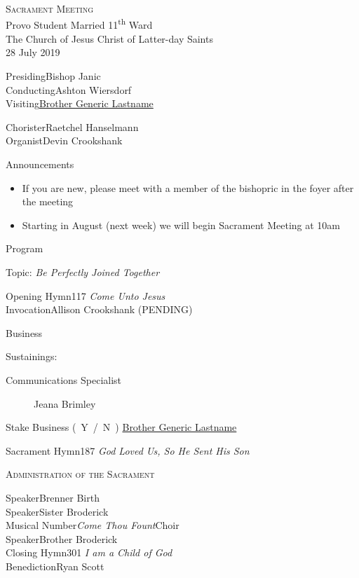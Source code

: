 \documentclass[11pt,letterpaper]{article}
\begin{document}
\begin{center}
  {\LARGE \textsc{Sacrament Meeting}}\\[0.2em]
  {\large Provo Student Married 11\textsuperscript{th} Ward}\\[0.3em]
  {\large The Church of Jesus Christ of Latter-day Saints}\\
  {28 July 2019}
\end{center}

Presiding{\dotfill}Bishop Janic\\
Conducting{\dotfill}Ashton Wiersdorf\\
Visiting{\dotfill}\uline{Brother Generic Lastname}

Chorister{\dotfill}Raetchel Hanselmann \\
Organist{\dotfill}Devin Crookshank

\begin{center}
  {\Large Announcements}
\end{center}

\begin{itemize}
\item If you are new, please meet with a member of the bishopric in the foyer after the meeting
\item Starting in August (next week) we will begin Sacrament Meeting at 10am
\end{itemize}

\begin{center}
  {\Large Program}
\end{center}
Topic: {\it Be Perfectly Joined Together}

Opening Hymn{\dotfill}117 \textit{Come Unto Jesus} \\
Invocation{\dotfill}Allison Crookshank (PENDING)

\begin{center}
  {\Large Business}
\end{center}
Sustainings:
\begin{description}
\item[Communications Specialist] Jeana Brimley
\end{description}

Stake Business (~Y~/~N~) \uline{Brother Generic Lastname}

Sacrament Hymn{\dotfill}187 \textit{God Loved Us, So He Sent His Son}

\begin{center}
  \textsc{Administration of the Sacrament}
\end{center}

Speaker{\dotfill}Brenner Birth \\
Speaker{\dotfill}Sister Broderick \\

Musical Number{\dotfill}\textit{Come Thou Fount}{\dotfill}Choir \\

Speaker{\dotfill}Brother Broderick \\

Closing Hymn{\dotfill}301 \textit{I am a Child of God} \\
Benediction{\dotfill}Ryan Scott
\end{document}
